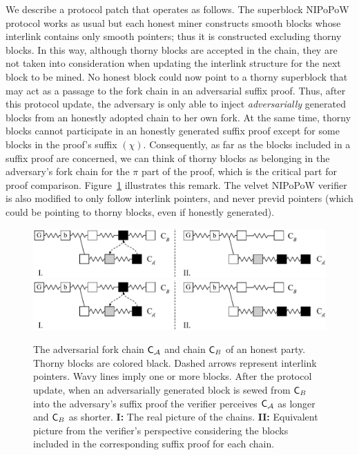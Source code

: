 We describe a protocol patch that operates as follows. The superblock NIPoPoW protocol works as usual but each honest miner constructs smooth blocks whose interlink contains only smooth pointers; thus it is constructed excluding thorny blocks. In this way, although thorny blocks are accepted in the chain, they are not taken into consideration when updating the interlink structure for the next block to be mined. No honest block could now point to a thorny superblock that may act as a passage to the fork chain in an adversarial suffix proof. Thus, after this protocol update, the adversary is only able to inject \emph{adversarially} generated blocks from an honestly adopted chain to her own fork.
At the same time, thorny blocks cannot participate in an honestly generated suffix proof except for some blocks in the proof's suffix $(\chi)$. Consequently, as far as the blocks included in a suffix proof are concerned, we can think of thorny blocks as belonging in the adversary's fork chain for the $\pi$ part of the proof,  which is the critical part for proof comparison.
Figure~\ref{fig:injection} illustrates this remark. The velvet NIPoPoW verifier is also modified to only follow interlink pointers, and never previd pointers (which could be pointing to thorny blocks, even if honestly generated).

\begin{figure}[h!]
	\centering
	\iftwocolumn
		\includegraphics[width=0.8 \textwidth]{figures/injection.pdf}
	\else
		\includegraphics[width=0.8 \textwidth]{figures/injection.pdf}
	\fi
	\caption{The adversarial fork chain $\mathsf{C}_\mathcal{A}$ and chain $\mathsf{C}_B$ of an honest party. Thorny blocks are colored black. Dashed arrows represent interlink pointers. Wavy lines imply one or more blocks. After the protocol update, when an adversarially generated block is sewed from $\mathsf{C}_B$ into the adversary's suffix proof the verifier perceives $\mathsf{C}_\mathcal{A}$ as longer and $\mathsf{C}_B$ as shorter. \textbf{I:} The real picture of the chains. \textbf{II:} Equivalent picture from the verifier's perspective considering the blocks included in the corresponding suffix proof for each chain.}
	\label{fig:injection}
\end{figure}

